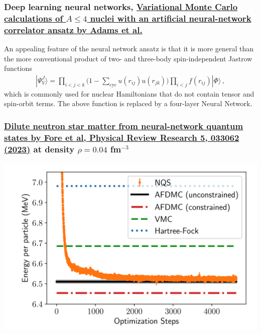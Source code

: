 \documentclass{beamer}
\begin{document}
\begin{frame}
\frametitle{Deep learning neural networks, \href{{https://journals.aps.org/prl/abstract/10.1103/PhysRevLett.127.022502}}{Variational Monte Carlo calculations of $A\le 4$ nuclei with an artificial neural-network correlator ansatz by Adams et al.}}

An appealing feature of the neural network ansatz is that it is more general than the more conventional product of two-
and three-body spin-independent Jastrow functions
\begin{align}
|\Psi_V^J \rangle = \prod_{i<j<k} \Big( 1-\sum_{\text{cyc}} u(r_{ij}) u(r_{jk})\Big) \prod_{i<j} f(r_{ij}) | \Phi\rangle\,,
\end{align}
which is commonly used for nuclear Hamiltonians that do not contain tensor and spin-orbit terms.
The above function is replaced by a four-layer Neural Network.
\end{frame}

\begin{frame}
\frametitle{\href{{https://journals.aps.org/prresearch/pdf/10.1103/PhysRevResearch.5.033062}}{Dilute neutron star matter from neural-network quantum states by Fore et al, Physical Review Research 5, 033062 (2023)} at density $\rho=0.04$ fm$^{-3}$}

\begin{block}{}

\vspace{6mm}

\centerline{\includegraphics[width=0.9\linewidth]{figures/nmatter.png}}

\vspace{6mm}

\end{block}
\end{frame}
\end{document}

